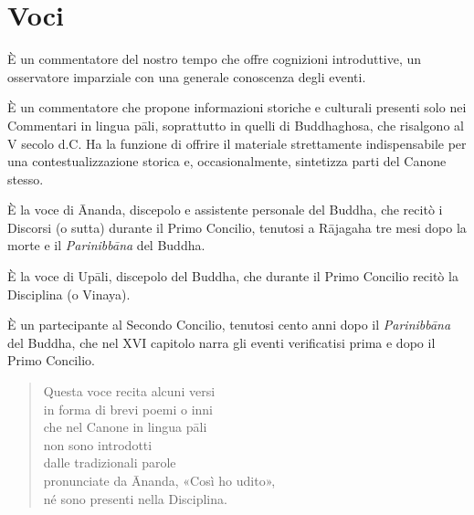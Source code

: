 \chapter{Voci}

 È un commentatore del nostro tempo che offre cognizioni
introduttive, un osservatore imparziale con una generale conoscenza
degli eventi.

 È un commentatore che propone informazioni storiche e
culturali presenti solo nei Commentari in lingua pāli, soprattutto in
quelli di Buddhaghosa, che risalgono al V secolo d.C. Ha la funzione di
offrire il materiale strettamente indispensabile per una
contestualizzazione storica e, occasionalmente, sintetizza parti del
Canone stesso.

 È la voce di Ānanda, discepolo e assistente personale del
Buddha, che recitò i Discorsi (o sutta) durante il Primo Concilio,
tenutosi a Rājagaha tre mesi dopo la morte e il \emph{Parinibbāna} del
Buddha.

 È la voce di Upāli, discepolo del Buddha, che durante il
Primo Concilio recitò la Disciplina (o Vinaya).

 È un partecipante al Secondo Concilio, tenutosi cento anni
dopo il \emph{Parinibbāna} del Buddha, che nel XVI capitolo narra gli eventi
verificatisi prima e dopo il Primo Concilio.


\begin{quote}
Questa voce recita alcuni versi \\
in forma di brevi poemi o inni \\
che nel Canone in lingua pāli \\
non sono introdotti \\
dalle tradizionali parole \\
pronunciate da Ānanda, «Così ho udito», \\
né sono presenti nella Disciplina.
\end{quote}

